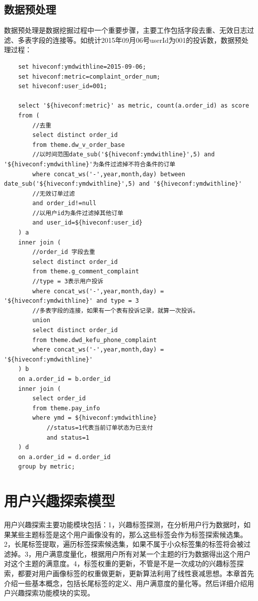   \subsection{数据预处理}
  数据预处理是数据挖掘过程中一个重要步骤，主要工作包括字段去重、无效日志过滤、多表字段的连接等。如统计2015年09月06号userId为001的投诉数，数据预处理过程：
  \begin{lstlisting}
    set hiveconf:ymdwithline=2015-09-06;
    set hiveconf:metric=complaint_order_num;
    set hiveconf:user_id=001;

    select '${hiveconf:metric}' as metric, count(a.order_id) as score
    from (
        //去重
        select distinct order_id
        from theme.dw_v_order_base
        //以时间范围date_sub('${hiveconf:ymdwithline}',5) and '${hiveconf:ymdwithline}'为条件过滤掉不符合条件的订单
        where concat_ws('-',year,month,day) between date_sub('${hiveconf:ymdwithline}',5) and '${hiveconf:ymdwithline}'
        //无效订单过滤
        and order_id!=null
        //以用户id为条件过滤掉其他订单
        and user_id=${hiveconf:user_id}
    ) a
    inner join (
        //order_id 字段去重
        select distinct order_id
        from theme.g_comment_complaint
        //type = 3表示用户投诉
        where concat_ws('-',year,month,day) = '${hiveconf:ymdwithline}' and type = 3
        //多表字段的连接，如果有一个表有投诉记录，就算一次投诉。
        union
        select distinct order_id
        from theme.dwd_kefu_phone_complaint
        where concat_ws('-',year,month,day) = '${hiveconf:ymdwithline}'
    ) b
    on a.order_id = b.order_id
    inner join (
        select order_id
        from theme.pay_info
        where ymd = ${hiveconf:ymdwithline}
            //status=1代表当前订单状态为已支付
            and status=1
    ) d
    on a.order_id = d.order_id
    group by metric;
  \end{lstlisting}

\section{用户兴趣探索模型}
用户兴趣探索主要功能模块包括：1，兴趣标签探测，在分析用户行为数据时，如果某些主题标签是这个用户画像没有的，那么这些标签会作为标签探索候选集。2，长尾标签提取，遍历标签探索候选集，如果不属于小众标签集的标签将会被过滤掉。3，用户满意度量化，根据用户所有对某一个主题的行为数据得出这个用户对这个主题的满意度。4，标签权重的更新，不管是不是一次成功的兴趣标签探索，都要对用户画像标签的权重做更新，更新算法利用了线性衰减思想。本章首先介绍一些基本概念，包括长尾标签的定义、用户满意度的量化等。然后详细介绍用户兴趣探索功能模块的实现。
